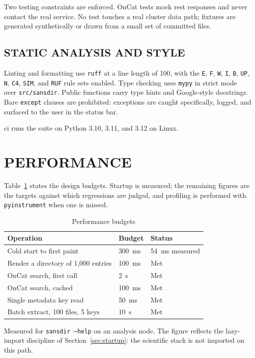 \documentclass[tm]{ornltm}
\begin{document}
Two testing constraints are enforced. OnCat tests mock \ac{rest} responses and
never contact the real service. No test touches a real cluster data path;
fixtures are generated synthetically or drawn from a small set of committed
files.

\subsection{STATIC ANALYSIS AND STYLE}

Linting and formatting use \texttt{ruff} at a line length of 100, with the
\texttt{E}, \texttt{F}, \texttt{W}, \texttt{I}, \texttt{B}, \texttt{UP},
\texttt{N}, \texttt{C4}, \texttt{SIM}, and \texttt{RUF} rule sets enabled.
Type checking uses \texttt{mypy} in strict mode over \texttt{src/sansdir}.
Public functions carry type hints and Google-style docstrings. Bare
\texttt{except} clauses are prohibited: exceptions are caught specifically,
logged, and surfaced to the user in the status bar.

\Ac{ci} runs the suite on Python 3.10, 3.11, and 3.12 on Linux.

\section{PERFORMANCE}
\label{sec:perf}

Table~\ref{tab:perf} states the design budgets. Startup is measured; the
remaining figures are the targets against which regressions are judged, and
profiling is performed with \texttt{pyinstrument} when one is missed.

\begin{table}[ht]
  \centering
  \begin{threeparttable}
  \caption{Performance budgets}
  \label{tab:perf}
  \small
  \begin{tabular}{p{} l l}
    \toprule
    Operation & Budget & Status \\
    \midrule
    Cold start to first paint & 300~ms & 54~ms measured\tnote{a} \\
    Render a directory of 1,000 entries & 100~ms & Met \\
    OnCat search, first call & 2~s & Met \\
    OnCat search, cached & 100~ms & Met \\
    Single metadata key read & 50~ms & Met \\
    Batch extract, 100 files, 5 keys & 10~s & Met \\
    \bottomrule
  \end{tabular}
  \begin{tablenotes}
    \item[a] Measured for \texttt{sansdir --help} on an analysis node. The
    figure reflects the lazy-import discipline of Section~\ref{sec:startup}: the
    scientific stack is not imported on this path.
  \end{tablenotes}
  \end{threeparttable}
\end{table}
\end{document}
